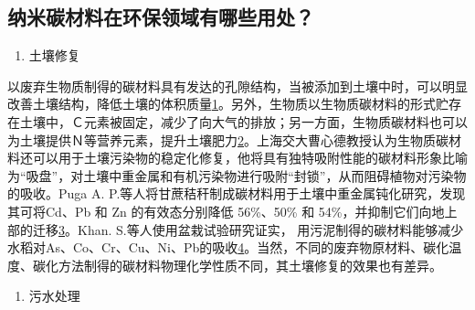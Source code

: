 \documentclass[
]{book}
\providecommand{\tightlist}{%
  \setlength{\itemsep}{0pt}\setlength{\parskip}{0pt}}
\begin{document}
\hypertarget{ux7eb3ux7c73ux78b3ux6750ux6599ux5728ux73afux4fddux9886ux57dfux6709ux54eaux4e9bux7528ux5904}{%
\subsection{纳米碳材料在环保领域有哪些用处？}\label{ux7eb3ux7c73ux78b3ux6750ux6599ux5728ux73afux4fddux9886ux57dfux6709ux54eaux4e9bux7528ux5904}}

\begin{enumerate}
\def\labelenumi{\arabic{enumi}.}
\tightlist
\item
  土壤修复
\end{enumerate}

以废弃生物质制得的碳材料具有发达的孔隙结构，当被添加到土壤中时，可以明显改善土壤结构，降低土壤的体积质量\href{陈心想，耿增超。西北农林科技大学学报（自然科学版），2013，41:\%20167-174．}{1}。另外，生物质以生物质碳材料的形式贮存在土壤中，Ｃ元素被固定，减少了向大气的排放；另一方面，生物质碳材料也可以为土壤提供Ｎ等营养元素，提升土壤肥力\href{Kezhen\%20Qian,\%20Ajay\%20Kumar,\%20et.al.\%20Renew.\%20and\%20Sustain.\%20Energy\%20Reviews,\%202015,\%2042:\%201055-1064.}{2}。上海交大曹心德教授认为生物质碳材料还可以用于土壤污染物的稳定化修复，他将具有独特吸附性能的碳材料形象比喻为``吸盘''，对土壤中重金属和有机污染物进行吸附``封锁''，从而阻碍植物对污染物的吸收。Puga A. P.等人将甘蔗秸秆制成碳材料用于土壤中重金属钝化研究，发现其可将Cd、Pb 和 Zn 的有效态分别降低 56\%、50\% 和 54\%，并抑制它们向地上部的迁移\href{Puga\%20A\%20P,\%20Abreu\%20C\%20A,\%20et\%20al.\%20J.\%20of\%20Environ.\%20Manage.,\%202015,\%20159:\%2086–93.}{3}。Khan. S.等人使用盆栽试验研究证实， 用污泥制得的碳材料能够减少水稻对As、Co、Cr、Cu、Ni、Pb的吸收\href{Khan\%20S,\%20Cai\%20Chao,\%20et\%20al．\%20Environ.\%20Sci.\%20\&\%20Technol.,\%202013,\%2047\%20:\%208624-8632．}{4}。当然，不同的废弃物原材料、碳化温度、碳化方法制得的碳材料物理化学性质不同，其土壤修复的效果也有差异。

\begin{enumerate}
\def\labelenumi{\arabic{enumi}.}
\setcounter{enumi}{1}
\tightlist
\item
  污水处理
\end{enumerate}
\end{document}
